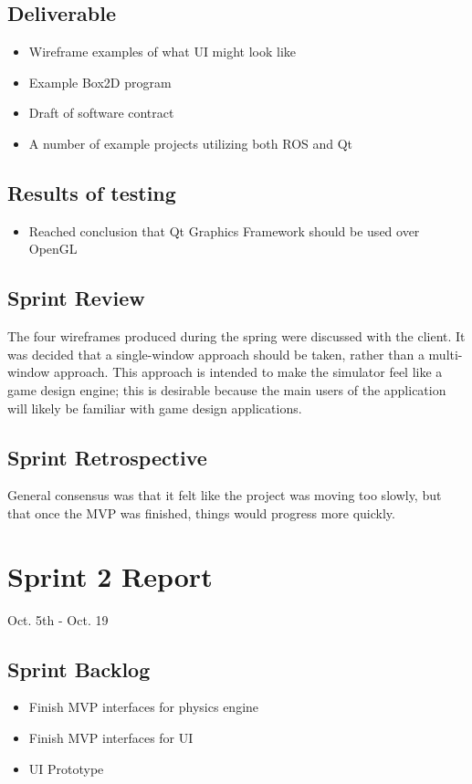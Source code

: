\subsection{Deliverable}
\begin{itemize}
	\item Wireframe examples of what UI might look like
	\item Example Box2D program
	\item Draft of software contract
	\item A number of example projects utilizing both ROS and Qt
\end{itemize}
\subsection{Results of testing}
\begin{itemize}
	\item Reached conclusion that Qt Graphics Framework should be used over OpenGL
\end{itemize}
\subsection{Sprint Review}
The four wireframes produced during the spring were discussed with the client. It was decided that a single-window approach should be taken, rather than a multi-window approach. This approach is intended to make the simulator feel like a game design engine; this is desirable because the main users of the application will likely be familiar with game design applications.
\subsection{Sprint Retrospective}
General consensus was that it felt like the project was moving too slowly, but that once the MVP was finished, things would progress more quickly.


\section{Sprint 2 Report}
Oct. 5th - Oct. 19
\subsection{Sprint Backlog}
\begin{itemize}
	\item Finish MVP interfaces for physics engine
	\item Finish MVP interfaces for UI
	\item UI Prototype
\end{itemize}
